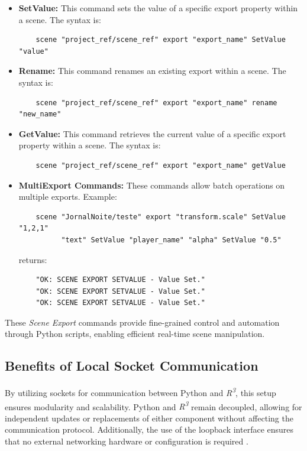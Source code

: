 \begin{itemize}
    \item \textbf{SetValue:} This command sets the value of a specific export property within a scene. The syntax is:
    \begin{verbatim}
    scene "project_ref/scene_ref" export "export_name" SetValue "value"
    \end{verbatim}
    \item \textbf{Rename:} This command renames an existing export within a scene. The syntax is:
    \begin{verbatim}
    scene "project_ref/scene_ref" export "export_name" rename "new_name"
    \end{verbatim}
    \item \textbf{GetValue:} This command retrieves the current value of a specific export property within a scene. The syntax is:
    \begin{verbatim}
    scene "project_ref/scene_ref" export "export_name" getValue
    \end{verbatim}
    \item \textbf{MultiExport Commands:} These commands allow batch operations on multiple exports. Example:
    \begin{verbatim}
    scene "JornalNoite/teste" export "transform.scale" SetValue "1,2,1"
          "text" SetValue "player_name" "alpha" SetValue "0.5"
    \end{verbatim}
    returns:
    \begin{verbatim}
    "OK: SCENE EXPORT SETVALUE - Value Set."
    "OK: SCENE EXPORT SETVALUE - Value Set."
    "OK: SCENE EXPORT SETVALUE - Value Set."
    \end{verbatim}
\end{itemize}

\noindent These \textit{Scene Export} commands provide fine-grained control and automation through Python scripts, enabling efficient real-time scene manipulation.


\subsection{Benefits of Local Socket Communication}
\noindent By utilizing sockets for communication between Python and \textit{R\textsuperscript{3}}, this setup ensures modularity and scalability. Python and \textit{R\textsuperscript{3}} remain decoupled, allowing for independent updates or replacements of either component without affecting the communication protocol. Additionally, the use of the loopback interface ensures that no external networking hardware or configuration is required \cite{silberschatz2018os}.

